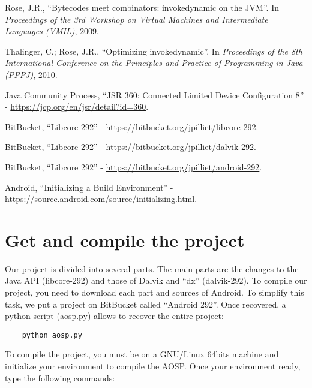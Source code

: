\documentclass{sig-alternate}
\begin{document}
\begin{thebibliography}{}
  Rose, J.R., ``Bytecodes meet combinators: invokedynamic on the JVM''. In {\it Proceedings of the 3rd Workshop on Virtual Machines and Intermediate Languages (VMIL)}, 2009.

  Thalinger, C.; Rose, J.R., ``Optimizing invokedynamic''. In {\it Proceedings of the 8th International Conference on the Principles and Practice of Programming in Java (PPPJ)}, 2010.

  Java Community Process, ``JSR 360: Connected Limited Device Configuration 8'' - \url{https://jcp.org/en/jsr/detail?id=360}.

  BitBucket, ``Libcore 292'' - \url{https://bitbucket.org/jpilliet/libcore-292}.

  BitBucket, ``Libcore 292'' - \url{https://bitbucket.org/jpilliet/dalvik-292}.

  BitBucket, ``Libcore 292'' - \url{https://bitbucket.org/jpilliet/android-292}.

  Android, ``Initializing a Build Environment'' - \url{https://source.android.com/source/initializing.html}.

\end{thebibliography}

\section{Get and compile the project}

  Our project is divided into several parts.
  The main parts are the changes to the Java API (libcore-292\cite{bb-libcore}) and those of Dalvik and ``dx'' (dalvik-292\cite{bb-dalvik}).
  To compile our project, you need to download each part and sources of Android.
  To simplify this task, we put a project on BitBucket called ``Android 292''\cite{bb-android}.
  Once recovered, a python script (aosp.py) allows to recover the entire project:

  {\scriptsize \begin{verbatim}
    python aosp.py
  \end{verbatim}}\vspace{-.8em}

  To compile the project, you must be on a GNU/Linux 64bits machine and initialize your environment to compile the AOSP\cite{android-sources}.
  Once your environment ready, type the following commands:
 
\end{document}
